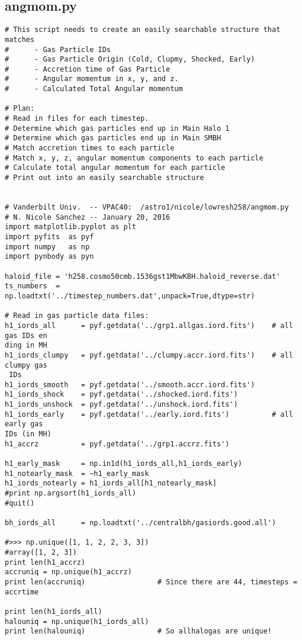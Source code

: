 \documentclass[12pt,headA,chapB]{fiskthesis}
\begin{document}
\subsection{angmom.py}
\begin{verbatim}
# This script needs to create an easily searchable structure that matches
#      - Gas Particle IDs
#      - Gas Particle Origin (Cold, Clupmy, Shocked, Early)
#      - Accretion time of Gas Particle
#      - Angular momentum in x, y, and z.
#      - Calculated Total Angular momentum

# Plan:
# Read in files for each timestep.
# Determine which gas particles end up in Main Halo 1 
# Determine which gas particles end up in Main SMBH
# Match accretion times to each particle
# Match x, y, z, angular momentum components to each particle
# Calculate total angular momentum for each particle
# Print out into an easily searchable structure


# Vanderbilt Univ.  -- VPAC40:  /astro1/nicole/lowresh258/angmom.py 
# N. Nicole Sanchez -- January 20, 2016 
import matplotlib.pyplot as plt
import pyfits  as pyf
import numpy   as np
import pynbody as pyn

haloid_file = 'h258.cosmo50cmb.1536gst1MbwKBH.haloid_reverse.dat'
ts_numbers  = np.loadtxt('../timestep_numbers.dat',unpack=True,dtype=str)

# Read in gas particle data files:  
h1_iords_all      = pyf.getdata('../grp1.allgas.iord.fits')    # all gas IDs en
ding in MH
h1_iords_clumpy   = pyf.getdata('../clumpy.accr.iord.fits')    # all clumpy gas
 IDs
h1_iords_smooth   = pyf.getdata('../smooth.accr.iord.fits')
h1_iords_shock    = pyf.getdata('../shocked.iord.fits')
h1_iords_unshock  = pyf.getdata('../unshock.iord.fits')
h1_iords_early    = pyf.getdata('../early.iord.fits')          # all early gas 
IDs (in MH)
h1_accrz          = pyf.getdata('../grp1.accrz.fits')

h1_early_mask     = np.in1d(h1_iords_all,h1_iords_early)
h1_notearly_mask  = ~h1_early_mask
h1_iords_notearly = h1_iords_all[h1_notearly_mask]
#print np.argsort(h1_iords_all)
#quit()

bh_iords_all      = np.loadtxt('../centralbh/gasiords.good.all')

#>>> np.unique([1, 1, 2, 2, 3, 3])
#array([1, 2, 3])
print len(h1_accrz)
accruniq = np.unique(h1_accrz)
print len(accruniq)                 # Since there are 44, timesteps = accrtime

print len(h1_iords_all)
halouniq = np.unique(h1_iords_all)
print len(halouniq)                 # So allhalogas are unique!


\end{verbatim}
\end{document}
